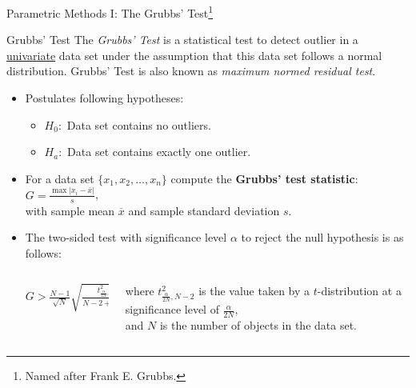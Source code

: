 \begin{frame}{Parametric Methods I: The Grubbs' Test\footnote{Named after Frank E. Grubbs.}}
	\begin{block}{Grubbs' Test}
		The \textit{Grubbs' Test} is a statistical test to detect outlier in a \underline{univariate} data set under the assumption that this data set follows a normal distribution. Grubbs' Test is also known as \textit{maximum normed residual test}.
	\end{block}
	\begin{itemize}
		\item Postulates following hypotheses:
		      \begin{itemize}
			      \item $H_0:$ Data set contains no outliers.
			      \item $H_a:$ Data set contains exactly one outlier.
		      \end{itemize}
		\item For a data set $\{x_1, x_2, \dots, x_n\}$ compute the \textbf{Grubbs' test statistic}:  $G = \frac{\max\vert x_i - \overline{x}\vert}{s}$,\\
		      with sample mean $\overline{x}$ and  sample standard deviation $s$.

		\item The two-sided test with significance level $\alpha$ to reject the null hypothesis is as follows:
		      \begin{columns}
			      \begin{column}{0.3\columnwidth}
				      \vspace*{-1em}
				      \begin{flushright}
					      $G > \frac{N-1}{\sqrt{N}} \sqrt{\frac{t^2_{\frac{\alpha}{2N},N-2}}{N-2 + t^2_{\frac{\alpha}{2N},N-2}}}$
				      \end{flushright}
				      \vspace*{0.5em}
			      \end{column}
			      \begin{column}{0.6\columnwidth}
				      where $t^2_{\frac{\alpha}{2N},N-2}$ is the value taken by a $t$-distribution at a significance level of $\frac{\alpha}{2N}$,\\ and $N$ is the number of objects in the data set.
			      \end{column}
		      \end{columns}

	\end{itemize}
\end{frame}


